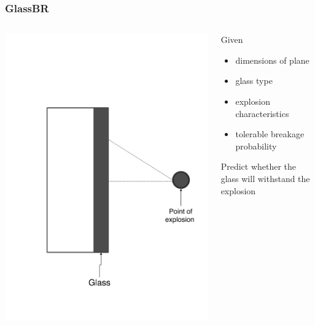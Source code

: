 \documentclass[usenames,dvipsnames]{beamer}
\begin{document}

\begin{frame}

  \frametitle{GlassBR}
  
  \begin{columns}
  \begin{column}{0.5\textwidth}
  \includegraphics[width=1.0\textwidth]{physicalsystimage.png}
  \end{column}
  \begin{column}{0.5\textwidth}
  Given
  
  \begin{itemize}
  \item dimensions of plane
  \item glass type
  \item explosion characteristics
  \item tolerable breakage probability
  \end{itemize}
  
  Predict whether the glass will withstand the explosion
  
  \end{column}
  \end{columns}
  
\end{frame}
  
\end{document}
